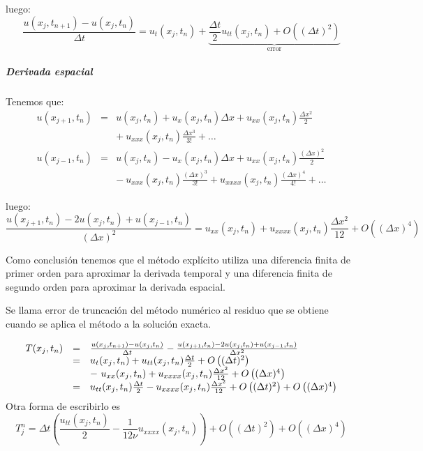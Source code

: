 luego:
$$\frac{u(x_j,t_{n+1}) - u(x_j, t_n)}{\Delta t} = u_t(x_j,t_n) + \underbrace{\frac{\Delta t}{2} u_{tt}(x_j,t_n) + O\left((\Delta t)^2\right)}_{\text{error}}$$

\subparagraph*{Derivada espacial} 
\mbox{}

Tenemos que:
\begin{equation*}
\begin{array}{lll}
u(x_{j+1}, t_n) &=& u(x_j,t_n) + u_x(x_j,t_n)\Delta x + u_{xx}(x_j,t_n)\frac{\Delta x^2}{2}\\ &&+\  u_{xxx}(x_j,t_n)\frac{\Delta x^3}{3!}  + \hdots\\
u(x_{j-1},t_n) &=& u(x_j, t_n) - u_x(x_j,t_n)\Delta x + u_{xx}(x_j,t_n)\frac{(\Delta x)^2}{2}\\ &&-\ u_{xxx}(x_j, t_n)\frac{(\Delta x)^3}{3!} + u_{xxxx}(x_j,t_n)\frac{(\Delta x)^4}{4!} + \hdots
\end{array}
\end{equation*}

luego:
$$\frac{u(x_{j+1}, t_n) - 2u(x_j,t_n) + u(x_{j-1},t_n)}{(\Delta x)^2} = u_{xx}(x_j,t_n) +  u_{xxxx}(x_j, t_n)\frac{\Delta x^2}{12} + O\left((\Delta x)^4\right)$$

Como conclusión tenemos que el método explícito utiliza una diferencia finita de primer orden para aproximar la derivada temporal y una diferencia finita de segundo orden para aproximar la derivada espacial.

\begin{defn}
Se llama error de truncación del método numérico al residuo que se obtiene cuando se aplica el método a la solución exacta.
\end{defn}
\begin{equation*}
\begin{array}{l l l}
T(x_j,t_n) &=& \frac{u(x_j,t_{n+1})-u(x_j,t_n)}{\Delta t} - \frac{u(x_{j+1},t_n)-2u(x_j,t_n)+u(x_{j-1},t_n)}{\Delta x^2}\\ 
& = & u_t(x_j,t_n) + u_{tt}(x_j,t_n)\frac{\Delta t}{2} + O \left((\Delta t)^2\right) \\
&& -\ u_{xx}(x_j,t_n) + u_{xxxx}(x_j,t_n)\frac{\Delta x^2}{12} + O\left((\Delta x)^4\right)\\ 
& = & u_{tt}(x_j,t_n)\frac{\Delta t}{2} -  u_{xxxx}(x_j,t_n)\frac{\Delta x^2}{12} + O\left((\Delta t)^2\right) + O\left((\Delta x)^4\right)
\end{array}
\end{equation*}
Otra forma de escribirlo es
$$T_j^n = \Delta t \left(\frac{u_{tt}(x_j,t_n)}{2}- \frac{1}{12\nu} u_{xxxx}(x_j,t_n)\right) + O\left((\Delta t)^2\right) + O\left((\Delta x)^4\right)$$


